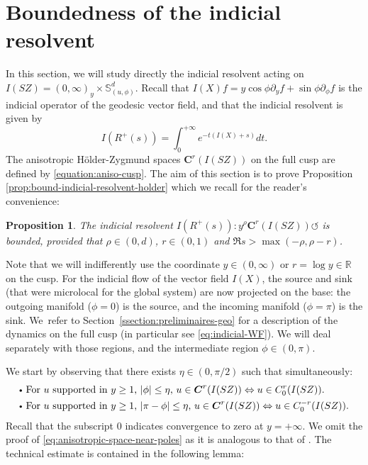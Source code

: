 \documentclass[10pt]{amsart}
\newcommand{\sbullet}{{\scriptscriptstyle\bullet}}
\newcommand{\csbullet}{{\raisebox{1pt}{$\sbullet$}}}
\newcommand{\bC}{\boldsymbol{C}}
\newcommand{\R}{\mathbb{R}}
\newcommand{\Ss}{\mathbb{S}}
\newcommand{\ZZ}{I(SZ)}
\theoremstyle{plain}
\newtheorem{proposition}{Proposition}[section]
\theoremstyle{definition}
\begin{document}
\section{Boundedness of the indicial resolvent}

\label{appendix:c}

In this section, we will study directly the indicial resolvent acting on $\ZZ=(0,\infty)_y \times \Ss^d_{(u,\phi)}$. Recall that $I(X)f = y \cos \phi \partial_y f + \sin\phi\partial_\phi f$ is the indicial operator of the geodesic vector field, and that the indicial resolvent is given by
\[
I(R^+(s)) = \int_0^{+\infty} e^{-t(I(X)+s)} dt.
\]
The anisotropic Hölder-Zygmund spaces $\bC^r(\ZZ)$ on the full cusp are defined by \eqref{equation:aniso-cusp}. The aim of this section is to prove Proposition \ref{prop:bound-indicial-resolvent-holder} which we recall for the reader's convenience:
\begin{proposition}
The indicial resolvent $I(R^+(s)): y^\rho \bC^r(\ZZ) \circlearrowleft$ is bounded, provided that $\rho \in (0,d)$, $r \in (0,1)$ and $\Re s > \max(-\rho,\rho-r)$.
\end{proposition}

Note that we will indifferently use the coordinate $y \in (0,\infty)$ or $r = \log y \in \R$ on the cusp. For the indicial flow of the vector field $I(X)$, the source and sink (that were microlocal for the global system) are now projected on the base: the outgoing manifold ($\phi=0$) is the source, and the incoming manifold ($\phi=\pi$) is the sink. We~refer to Section~\ref{ssection:preliminaires-geo} for a description of the dynamics on the full cusp (in particular see \eqref{eq:indicial-WF}). We will deal separately with those regions, and the intermediate region $\phi\in (0,\pi)$.

We start by observing that there exists $\eta \in (0,\pi/2)$ such that simultaneously:
\begin{equation}\label{eq:anisotropic-space-near-poles}
\begin{split}
&\csbullet \text{ For $u$ supported in $y\geq 1$, $|\phi|\leq \eta$, $u \in \bC^r(\ZZ) \Leftrightarrow u\in C^r_0(\ZZ)$}.\\
&\csbullet \text{ For $u$ supported in $y\geq 1$, $|\pi-\phi|\leq \eta$, $u\in\bC^r(\ZZ) \Leftrightarrow u\in C^{-r}_0(\ZZ)$.}
\end{split}
\end{equation}
Recall that the subscript $0$ indicates convergence to zero at $y=+\infty$. We omit the proof of \eqref{eq:anisotropic-space-near-poles} as it is analogous to that of \cite[Lem.\,5.3]{Bonthonneau-Weich-17}. The technical estimate is contained in the following lemma:
\end{document}
